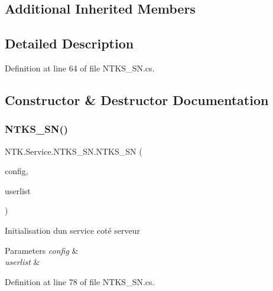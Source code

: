 \subsection*{Additional Inherited Members}


\subsection{Detailed Description}




Definition at line 64 of file N\+T\+K\+S\+\_\+\+S\+N.\+cs.



\subsection{Constructor \& Destructor Documentation}
\mbox{\label{class_n_t_k_1_1_service_1_1_n_t_k_s___s_n_a919e7aa83cbe6508b3e05a4a5985e82b}} 
\subsubsection{\texorpdfstring{NTKS\_SN()}{NTKS\_SN()}\hspace{0.1cm}{\footnotesize\ttfamily [1/3]}}
{\footnotesize\ttfamily N\+T\+K.\+Service.\+N\+T\+K\+S\+\_\+\+S\+N.\+N\+T\+K\+S\+\_\+\+SN (\begin{DoxyParamCaption}\item[{\mbox{\hyperlink{struct_n_t_k_1_1_service_1_1_service_config}{Service\+Config}}}]{config,  }\item[{List$<$ \mbox{\hyperlink{class_n_t_k_1_1_n_t_k_user}{N\+T\+K\+User}} $>$}]{userlist }\end{DoxyParamCaption})}



Initialisation d\textquotesingle{}un service coté serveur 


\begin{DoxyParams}{Parameters}
{\em config} & \\
\hline
{\em userlist} & \\
\hline
\end{DoxyParams}


Definition at line 78 of file N\+T\+K\+S\+\_\+\+S\+N.\+cs.

\mbox{\label{class_n_t_k_1_1_service_1_1_n_t_k_s___s_n_a055734905fedff05e050d26e105aee55}} 
